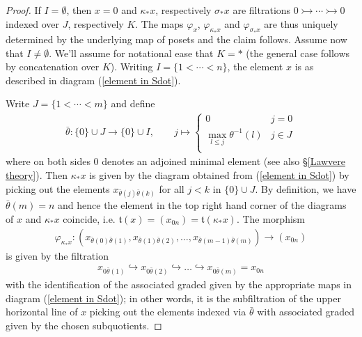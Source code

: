 \documentclass[12pt, reqno]{amsart}
\theoremstyle{plain}
\theoremstyle{definition}
\renewcommand{\phi}{\varphi}
\begin{document}
\begin{proof}
If $I=\emptyset$, then $x=0$ and $\kappa_*x$, respectively $\sigma_*x$ are filtrations $0\rightarrowtail \cdots \rightarrowtail 0$ indexed over $J$, respectively $K$. The maps $\phi_x$, $\phi_{\kappa_*x}$ and $\phi_{\sigma_*x}$ are thus uniquely determined by the underlying map of posets and the claim follows. Assume now that $I\neq \emptyset$. We'll assume for notational ease that $K=\ast$ (the general case follows by concatenation over $K$). Writing $I=\{1<\cdots <n\}$, the element $x$ is as described in diagram (\ref{element in Sdot}).

Write $J=\{1<\cdots <m\}$ and define
\begin{align*}
\bar{\theta}\colon \{0\}\cup J\rightarrow \{0\}\cup I,\qquad j\mapsto\begin{cases}
0 & j=0 \\
\mathop{\max}_{l\leq j} \theta^{-1}(l) & j\in J \\
\end{cases}
\end{align*}
where on both sides $0$ denotes an adjoined minimal element (see also \S \ref{Lawvere theory}). Then $\kappa_*x$ is given by the diagram obtained from (\ref{element in Sdot}) by picking out the elements $x_{\bar{\theta}(j)\bar{\theta}(k)}$ for all $j<k$ in $\{0\}\cup J$. By definition, we have $\bar{\theta}(m)=n$ and hence the element in the top right hand corner of the diagrams of $x$ and $\kappa_*x$ coincide, i.e. $\mathfrak{t}(x)=(x_{0n})=\mathfrak{t}(\kappa_*x)$. The morphism 
\begin{align*}
\phi_{\kappa_*x}\colon (x_{\bar{\theta}(0)\bar{\theta}(1)},x_{\bar{\theta}(1)\bar{\theta}(2)},\ldots,x_{\bar{\theta}(m-1)\bar{\theta}(m)})\longrightarrow (x_{0n})
\end{align*}
is given by the filtration
\begin{align*}
x_{0\bar{\theta}(1)}\hookrightarrow x_{0\bar{\theta}(2)}\hookrightarrow \ldots\hookrightarrow x_{0\bar{\theta}(m)}=x_{0n}
\end{align*}
with the identification of the associated graded given by the appropriate maps in diagram (\ref{element in Sdot}); in other words, it is the subfiltration of the upper horizontal line of $x$ picking out the elements indexed via $\bar{\theta}$ with associated graded given by the chosen subquotients.


\end{proof}
\end{document}
